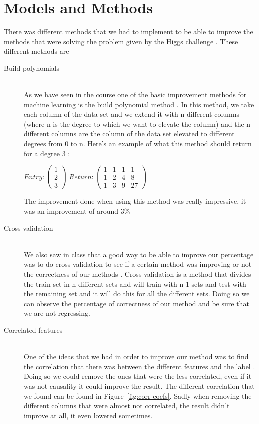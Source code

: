 \documentclass[10pt,conference,compsocconf]{IEEEtran}
\begin{document}
\section{Models and Methods}

There was different methods that we had to implement to be able to improve the methods that were solving the problem given by the Higgs challenge \cite{higgsChallenge14}. These different methods are

\begin{description}
\item[Build polynomials] \ \\
As we have seen in the course one of the basic improvement methods for machine learning is the build polynomial method \cite{MLcourse18}. In this method, we take each column of the data set and we extend it with n different columns (where n is the degree to which we want to elevate the column) and the n different columns are the column of the data set elevated to different degrees from 0 to n. Here's an example of what this method should return for a degree 3 : 

\begin{center}
$Entry : 
\begin{pmatrix}
 1 \\
 2 \\
 3 
\end{pmatrix}
$
$Return : 
\begin{pmatrix}
 1&1&1&1 \\
 1&2&4&8 \\
 1&3&9&27 
\end{pmatrix}
$
\end{center}
 
 The improvement done when using this method was really impressive, it was an improvement of around 3\%

\item[Cross validation] \ \\
We also saw in class that a good way to be able to improve our percentage was to do cross validation to see if a certain method was improving or not the correctness of our methods \cite{MLcourse18}. Cross validation is a method that divides the train set in n different sets and will train with n-1 sets and test with the remaining set and it will do this for all the different sets. Doing so we can observe the percentage of correctness of our method and be sure that we are not regressing.

\item[Correlated features] \ \\
One of the ideas that we had in order to improve our method was to find the correlation that there was between the different features and the label \cite{brown14}. Doing so we could remove the ones that were the less correlated, even if it was not causality it could improve the result. The different correlation that we found can be found in Figure~\ref{fig:corr-coefs}. Sadly when removing the different columns that were almost not correlated, the result didn't improve at all, it even lowered sometimes.


\end{description}
\end{document}
